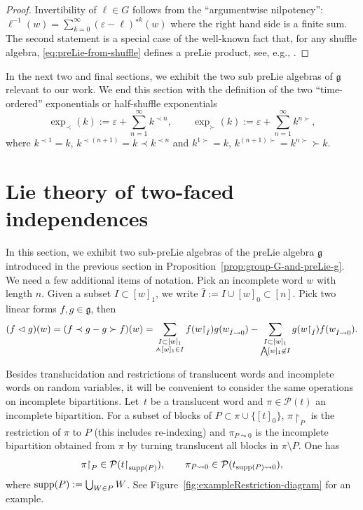\documentclass[pdftex]{sigma}
\renewcommand{\restriction}[2]{{#1\mathbin{\upharpoonright}_{#2}}}
\newcommand{\translucidation}[2]{{{#1}_{#2\leadsto0}}}
\newcommand{\bigwedgedots}{{\mathop{\bigwedge\hspace{-6.5pt}\raisebox{-1.5pt}[0pt][0pt]{$\cdot$}\hspace{2pt}}\nolimits}}
\newcommand{\wedgedot}{{\mathop{\wedge\hspace{-4.2pt}\raisebox{-1pt}[0pt][0pt]{$\cdot$}\hspace{2pt}}\nolimits}}
\newcommand{\BPc}{{\mathcal{P}}}
\numberwithin{equation}{section}
\begin{document}
\begin{proof}Invertibility of $\ell\in G$ follows from the ``argumentwise nilpotency'': $\ell^{-1}(w)=\sum_{k=0}^\infty (\varepsilon-\ell)^{\star k}(w)$ where the right hand side is a finite sum.
 The second statement is a special case of the well-known fact that, for any shuffle algebra, \eqref{eq:preLie-from-shuffle} defines a preLie product, see, e.g., \cite[Section~3.1]{ebrahimi2015cumulants}.
\end{proof}

In the next two and final sections, we exhibit the two sub preLie algebras of $\mathfrak{g}$ relevant to our work. We end this section with the definition of the two ``time-ordered'' exponentials or half-shuffle exponentials
\[
	\exp_{\prec}(k) := \varepsilon + \sum_{n=1}^{\infty} k^{\prec n},\qquad \exp_{\succ}(k) := \varepsilon + \sum_{n=1}^{\infty} k^{n \succ},
\]
where $k^{\prec 1} = k$, $k^{\prec (n+1)} = k \prec k^{\prec n}$ and
$k^{1 \succ } = k$, $k^{(n+1)\succ} = k^{n \succ}\succ k$.

\section{Lie theory of two-faced independences}\label{sec:momentscumulantsrelations}
In this section, we exhibit two sub-preLie algebras of the preLie algebra $\mathfrak{g}$ introduced in the previous section in Proposition~\ref{prop:group-G-and-preLie-g}. We need a few additional items of notation.
Pick an incomplete word $w$ with length $n$. Given a subset $I \subset [w]_1$, we write $\hat{I} := I \cup [w]_0 \subset [n]$. Pick two linear forms $f,g \in \mathfrak{g}$, then
\begin{align*}
 (f\vartriangleleft g)(w) = (f\prec g - g\succ f)(w) = \sum_{\substack{I \subset [w]_1 \\ {\wedgedot}[w]_1\in I}}f(\restriction{w}{\hat{I}})g(\translucidation{w}{\hat{I}}) - \sum_{\substack{I\subset [w]_1 \\ \bigwedgedots [w]_1 \not\in I}}g(\restriction{w}{\hat{I}})f(\translucidation{w}{\hat{I}}).
\end{align*}

Besides translucidation and restrictions of translucent words and incomplete words on random variables, it will be convenient to consider the same operations on incomplete bipartitions.
Let~$t$ be a translucent word
and $\pi \in \BPc( t )$ an incomplete bipartition.
For a subset of blocks of $P \subset \pi \cup \{[t]_0\}$, $\restriction{\pi}{P}$ is the restriction of $\pi$ to $P$ (this includes re-indexing) and $\translucidation{\pi}{P}$ is the incomplete bipartition obtained from $\pi$ by turning translucent all blocks in $\pi\setminus P$. One has
\[
 \restriction{\pi}{P} \in \BPc(\restriction{t}{{\rm supp} (P)}),\qquad \translucidation{\pi}{P} \in \BPc(\translucidation{t}{{\rm supp}(P)}),
\]
where ${\rm supp}(P):=\bigcup_{W\in P}W$.
See Figure~\ref{fig:exampleRestriction-diagram} for an example.
\end{document}
